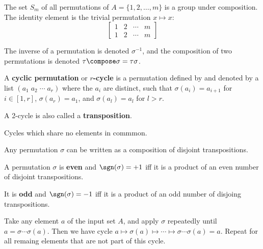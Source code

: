 \begin{theorem}
  The set $S_m$ of all permutations of $A = \{1, 2, \ldots, m\}$ is a group under composition. The identity element is the trivial permutation $x \mapsto x$:
  \[
    \begin{bmatrix}
      1 & 2 & \cdots & m \\
      1 & 2 & \cdots & m
    \end{bmatrix}
  \]

  The inverse of a permutation is denoted $\sigma^{-1}$, and the composition of two permutations is denoted $\tau \compose \sigma = \tau \sigma$.
\end{theorem}

\begin{definition}
  A \textbf{cyclic permutation} or \textbf{$r$-cycle} is a permutation defined by and denoted by a list $(a_1 \; a_2 \; \cdots \; a_r)$ where the $a_i$ are distinct, such that $\sigma(a_i) = a_{i + 1}$ for $i \in [1, r]$, $\sigma(a_r) = a_1$, and $\sigma(a_l) = a_l$ for $l > r$.

  A 2-cycle is also called a \textbf{transposition}.
\end{definition}

\begin{definition}
  Cycles which share no elements in commmon.
\end{definition}

\begin{theorem}
  Any permutation $\sigma$ can be written as a composition of disjoint transpositions.
\end{theorem}

\begin{definition}
  A permutation $\sigma$ is \textbf{even} and $\sgn(\sigma) = +1$ iff it is a product of an even number of disjoint transpositions.

  It is \textbf{odd} and $\sgn(\sigma) = -1$ iff it is a product of an odd number of disjoing transpositions.
\end{definition}

\begin{procedure}
  Take any element $a$ of the input set $A$, and apply $\sigma$ repeatedly until $a = \sigma \cdots \sigma(a)$. Then we have cycle $a \mapsto \sigma(a) \mapsto \cdots \mapsto \sigma \cdots \sigma(a) = a$. Repeat for all remaing elements that are not part of this cycle.
\end{procedure}

